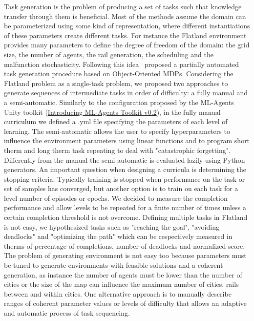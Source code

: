 \documentclass[11pt, a4paper, hidelinks]{report}
\begin{document}
Task generation is the problem of producing a set of tasks such that knowledge transfer through them is beneficial.
Most of the methods assume the domain can be parameterized using some kind of representation, where different instantiations of these parameters create different tasks.
For instance the Flatland environment provides many parameters to define the degree of freedom of the domain: the grid size, the number of agents, the rail generation, the scheduling and the malfunction stochasticity.
Following this idea~\citep{object-oriented-mdp} proposed a partially automated task generation procedure based on Object-Oriented MDPs.
Considering the Flatland problem as a single-task problem, we proposed two approaches to generate sequences of intermediate tasks in order of difficulty: a fully manual and a semi-automatic.
Similarly to the configuration proposed by the ML-Agents Unity toolkit (\href{https://blogs.unity3d.com/2017/12/08/introducing-ml-agents-v0-2-curriculum-learning-new-environments-and-more}{Introducing ML-Agents Toolkit v0.2}), in the fully manual curriculum we defined a .yml file specifying the parameters of each level of learning.
The semi-automatic allows the user to specify hyperparameters to influence the environment parameters using linear functions and to program short therm and long therm task repeating to deal with "catastrophic forgetting".
Differently from the manual the semi-automatic is evaluated lazily using Python generators.
An important question when designing a curricula is determining the stopping criteria.
Typically training is stopped when performance on the task or set of samples has converged, but another option is to train on each task for a level number of episodes or epochs.
We decided to measure the completion performance and allow levels to be repeated for a finite number of times unless a certain completion threshold is not overcome.
Defining multiple tasks in Flatland is not easy, we hypothesized tasks such as "reaching the goal", "avoiding deadlocks" and "optimizing the path" which can be respectively measured in therms of percentage of completions, number of deadlocks and normalized score.
The problem of generating environment is not easy too because parameters must be tuned to generate environments with feasible solutions and a coherent generation, as instance the number of agents must be lower than the number of cities or the size of the map can influence the maximum number of cities, rails between and within cities.
One alternative approach is to manually describe ranges of coherent parameter values or levels of difficulty that allows an adaptive and automatic process of task sequencing.
\end{document}

